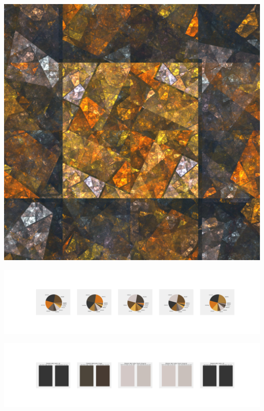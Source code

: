 \documentclass[11pt]{article}
\begin{document}
\begin{landscape}
    \begin{center}
    \includegraphics[width=\textwidth]{./nbimg/file (252).jpg}
    \end{center}

    \begin{center}
    \includegraphics[width=250mm]{./nbimg/pie-170.jpg}
    \end{center}

    \begin{center}
    \includegraphics[width=250mm]{./nbimg/peak-170.jpg}
    \end{center}
    


\end{landscape}
\end{document}
